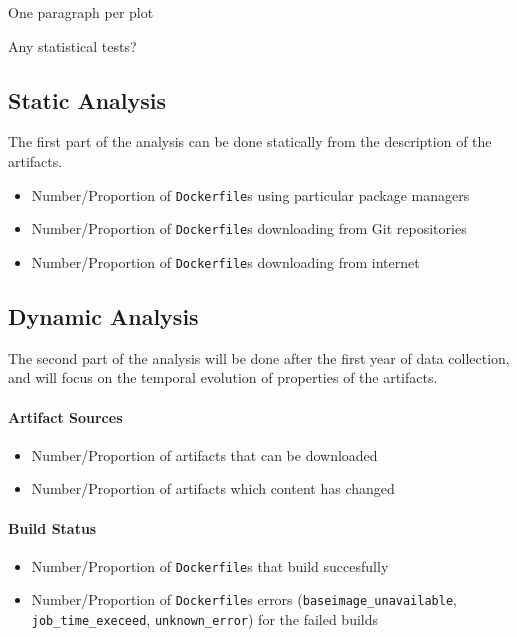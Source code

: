 \documentclass{article}
\newcommand{\dfile}{\texttt{Dockerfile}}
\begin{document}
One paragraph per plot

Any statistical tests?

\subsection{Static Analysis}

The first part of the analysis can be done statically from the description of the artifacts.

\begin{itemize}
\item Number/Proportion of \dfile s using particular package managers
\item Number/Proportion of \dfile s downloading from Git repositories
\item Number/Proportion of \dfile s downloading from internet
\end{itemize}

\subsection{Dynamic Analysis}

The second part of the analysis will be done after the first year of data collection, and will focus on the temporal evolution of properties of the artifacts.

\paragraph{Artifact Sources}

\begin{itemize}
\item Number/Proportion of artifacts that can be downloaded
\item Number/Proportion of artifacts which content has changed
\end{itemize}

\paragraph{Build Status}

\begin{itemize}
\item Number/Proportion of \dfile s that build succesfully
\item Number/Proportion of \dfile s errors (\texttt{baseimage\_unavailable}, \texttt{job\_time\_execeed}, \texttt{unknown\_error}) for the failed builds
\end{itemize}
\end{document}
